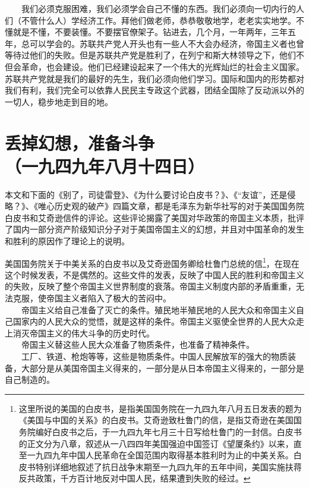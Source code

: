 \documentclass[cn,11pt,chinese]{elegantbook}
\def\myformat#1{\hfil\hfil #1}
\begin{document}
　　我们必须克服困难，我们必须学会自己不懂的东西。我们必须向一切内行的人们（不管什么人）学经济工作。拜他们做老师，恭恭敬敬地学，老老实实地学。不懂就是不懂，不要装懂。不要摆官僚架子。钻进去，几个月，一年两年，三年五年，总可以学会的。苏联共产党人开头也有一些人不大会办经济，帝国主义者也曾等待过他们的失败。但是苏联共产党是胜利了，在列宁和斯大林领导之下，他们不但会革命，也会建设。他们已经建设起来了一个伟大的光辉灿烂的社会主义国家。苏联共产党就是我们的最好的先生，我们必须向他们学习。国际和国内的形势都对我们有利，我们完全可以依靠人民民主专政这个武器，团结全国除了反动派以外的一切人，稳步地走到目的地。\\
\newpage\section*{\myformat{丢掉幻想，准备斗争}\\\myformat{（一九四九年八月十四日）}}
\begin{introduction}
\item 本文和下面的《别了，司徒雷登》、《为什么要讨论白皮书？》、《“友谊”，还是侵略？》、《唯心历史观的破产》四篇文章，都是毛泽东为新华社写的对于美国国务院白皮书和艾奇逊信件的评论。这些评论揭露了美国对华政策的帝国主义本质，批评了国内一部分资产阶级知识分子对于美国帝国主义的幻想，并且对中国革命的发生和胜利的原因作了理论上的说明。
\end{introduction}
美国国务院关于中美关系的白皮书以及艾奇逊国务卿给杜鲁门总统的信\footnote[1]{ 这里所说的美国的白皮书，是指美国国务院在一九四九年八月五日发表的题为《美国与中国的关系》的白皮书。艾奇逊致杜鲁门的信，是指艾奇逊在美国国务院编好白皮书之后，于一九四九年七月三十日写给杜鲁门的一封信。白皮书的正文分为八章，叙述从一八四四年美国强迫中国签订《望厦条约》以来，直至一九四九年中国人民革命在全国范围内取得基本胜利时为止的中美关系。白皮书特别详细地叙述了抗日战争末期至一九四九年的五年中间，美国实施扶蒋反共政策，千方百计地反对中国人民，结果遭到失败的经过。}，在现在这个时候发表，不是偶然的。这些文件的发表，反映了中国人民的胜利和帝国主义的失败，反映了整个帝国主义世界制度的衰落。帝国主义制度内部的矛盾重重，无法克服，使帝国主义者陷入了极大的苦闷中。\\
　　帝国主义给自己准备了灭亡的条件。殖民地半殖民地的人民大众和帝国主义自己国家内的人民大众的觉悟，就是这样的条件。帝国主义驱使全世界的人民大众走上消灭帝国主义的伟大斗争的历史时代。\\
　　帝国主义替这些人民大众准备了物质条件，也准备了精神条件。\\
　　工厂、铁道、枪炮等等，这些是物质条件。中国人民解放军的强大的物质装备，大部分是从美国帝国主义得来的，一部分是从日本帝国主义得来的，一部分是自己制造的。\\
\end{document}
